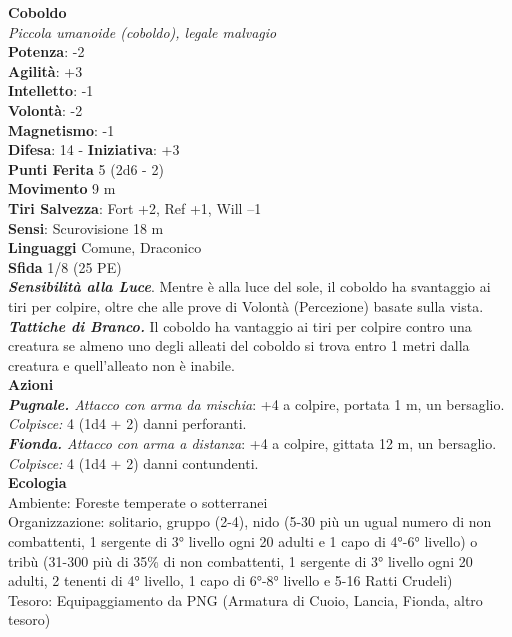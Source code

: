 \begin{multicols}{2}
\medskip\textbf{Coboldo}\\
\emph{Piccola umanoide (coboldo), legale malvagio}\\
\textbf{Potenza}: -2\\
\textbf{Agilità}: +3\\
\textbf{Intelletto}: -1\\
\textbf{Volontà}: -2\\
\textbf{Magnetismo}: -1\\
\textbf{Difesa}: 14 - \textbf{Iniziativa}: +3\\
\textbf{Punti Ferita} 5 (2d6 - 2)\\
\textbf{Movimento} 9 m\\
\textbf{Tiri Salvezza}: Fort +2, Ref +1, Will –1\\
\textbf{Sensi}: Scurovisione 18 m\\
\textbf{Linguaggi} Comune, Draconico\\
\textbf{Sfida} 1/8 (25 PE)\smallskip\\
\emph{\textbf{Sensibilità alla Luce}}. Mentre è alla luce del sole, il coboldo ha svantaggio ai tiri per colpire, oltre che alle prove di Volontà (Percezione) basate sulla vista.\\
\emph{\textbf{Tattiche di Branco.}} Il coboldo ha vantaggio ai tiri per colpire contro una creatura se almeno uno degli alleati del coboldo si trova entro 1 metri dalla creatura e quell'alleato non è inabile. \\
\smallskip\textbf{Azioni}\\
\emph{\textbf{Pugnale.} Attacco con arma da mischia}: +4 a colpire, portata 1 m, un bersaglio.\\
\emph{Colpisce:} 4 (1d4 + 2) danni perforanti.\\
\emph{\textbf{Fionda.} Attacco con arma a distanza}: +4 a colpire, gittata 12 m, un bersaglio.\\
\emph{Colpisce:} 4 (1d4 + 2) danni contundenti.\\
\textbf{Ecologia}\\
Ambiente: Foreste temperate o sotterranei\\
Organizzazione: solitario, gruppo (2-4), nido (5-30 più un ugual numero di non combattenti, 1 sergente di 3° livello ogni 20 adulti e 1 capo di 4°-6° livello) o tribù (31-300 più di 35\% di non combattenti, 1 sergente di 3° livello ogni 20 adulti, 2 tenenti di 4° livello, 1 capo di 6°-8° livello e 5-16 Ratti Crudeli)\\
Tesoro: Equipaggiamento da PNG (Armatura di Cuoio, Lancia, Fionda, altro tesoro)\\

\end{multicols}
